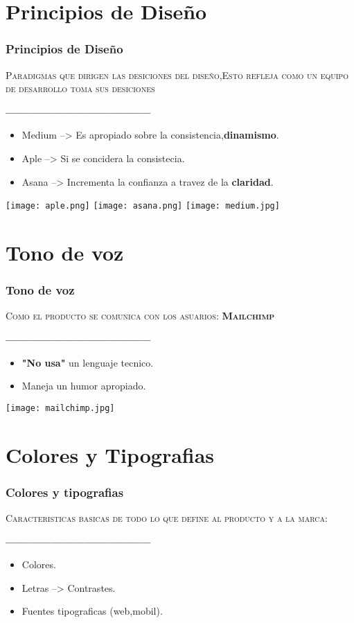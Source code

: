 \documentclass[11pt]{beamer}
\begin{document}
\section{Principios de Diseño}
\begin{frame}
\frametitle{Principios de Diseño}
\begin{itemize}
    \textsc{Paradigmas que dirigen las desiciones del diseño,Esto refleja como un equipo de desarrollo toma sus desiciones}
\end{itemize}
\textbf{---------------------------------------}
\begin{itemize}
    \item Medium --> Es apropiado sobre la consistencia,{\bf dinamismo}. 
    \item Aple --> Si se concidera la consistecia.
    \item Asana --> Incrementa la confianza a travez de la {\bf claridad}.
\end{itemize}
{\texttt{[image: aple.png]}}
{\texttt{[image: asana.png]}}
{\texttt{[image: medium.jpg]}}
\end{frame}

\section{Tono de voz}
\begin{frame}
\frametitle{Tono de voz}
\begin{itemize}
    \textsc{Como el producto se comunica con los asuarios: {\bf Mailchimp}}
\end{itemize}
\textbf{---------------------------------------}
\begin{itemize}
    \item {\bf "No usa"} un lenguaje tecnico. 
    \item Maneja un humor apropiado.
\end{itemize}
{\texttt{[image: mailchimp.jpg]}}
\end{frame}

\section{Colores y Tipografias}
\begin{frame}
\frametitle{Colores y tipografias}
\begin{itemize}
    \textsc{Caracteristicas basicas de todo lo que define al producto y a la marca:}
\end{itemize}
\textbf{---------------------------------------}
\begin{itemize}
    \item Colores.
    \item Letras --> Contrastes.
    \item Fuentes tipograficas (web,mobil).
\end{itemize}
\end{frame}
\end{document}
